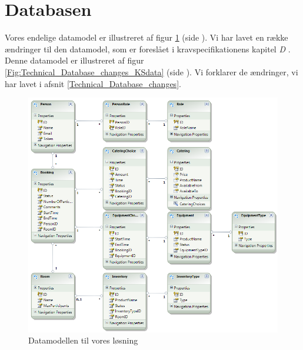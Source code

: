 \section{Databasen}
\label{Technical_Database}

Vores endelige datamodel er illustreret af figur \ref{Fig:Technical_Database_datamodel} (side \pageref{Fig:Technical_Database_datamodel}). Vi har lavet en række ændringer til den datamodel, som er foreslået i kravspecifikationens kapitel \textit{D} \cite[s.14]{kravspec}. Denne datamodel er illustreret af figur \ref{Fig:Technical_Database_changes_KSdata} (side \pageref{Fig:Technical_Database_changes_KSdata}). Vi forklarer de ændringer, vi har lavet i afsnit \ref{Technical_Database_changes}.

\begin{figure}[h!]
  \centering
    \includegraphics[width=\textwidth]{Chapters/Design/Technical/Images/OurDataModel}
  \caption{Datamodellen til vores løsning}
\label{Fig:Technical_Database_datamodel}
\end{figure}

